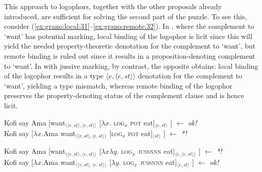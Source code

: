 \documentclass[output=paper,modfonts,nonflat]{langsci/langscibook}
\begin{document}
This approach to logophors, together with the other proposals already introduced, are sufficient for solving the second part of the puzzle. To see this, consider (\ref{ex:grano:local:31}--\ref{ex:grano:remote:32}). In , where the complement to `want' has potential marking, local binding of the logophor is licit since this will yield the needed property-theoretic denotation for the complement to `want', but remote binding is ruled out since it results in a proposition-denoting complement to `want'. In  with jussive marking, by contrast, the opposite obtains: local binding of the logophor results in a type $\langle e,\langle e,st\rangle\rangle$ denotation for the complement to `want', yielding a type mismatch, whereas remote binding of the logophor preserves the property-denoting status of the complement clause and is hence licit. 


\ea  \label{ex:grano:local:31}
    \begin{xlist}
    \ex Kofi  say Ama [want$_{\langle\langle e,st\rangle,\langle e,st\rangle\rangle}$ [$\lambda x$. \textsc{log}$_{x}$ \textsc{pot} eat]$_{\langle e,st\rangle}$ ] \hfill $\leftarrow$ \emph{ok!}\\
    \ex Kofi  say [$\lambda x$.Ama want$_{\langle\langle e,st\rangle,\langle e,st\rangle\rangle}$ [\textsc{log}$_{x}$ \textsc{pot} eat]$_{\langle st\rangle}$ ] \hfill $\leftarrow$ \emph{*!} 
    \end{xlist}
\z

\ea  \label{ex:grano:remote:32}
    \begin{xlist}
    \ex Kofi  say Ama [want$_{\langle\langle e,st\rangle,\langle e,st\rangle\rangle}$ [$\lambda x\lambda y$. \textsc{log}$_{x}$ \textsc{jussnnn} eat]$_{\langle e,\langle e,st\rangle\rangle}$ ] \hfill $\leftarrow$ \emph{*!}\\
    \ex Kofi  say [$\lambda x$.Ama want$_{\langle\langle e,st\rangle,\langle e,st\rangle\rangle}$ [$\lambda y$. \textsc{log}$_{x}$ \textsc{jussnnn} eat]$_{\langle e,st\rangle}$ ] \hfill $\leftarrow$ \emph{ok!} 
    \end{xlist}
\z
\end{document}
